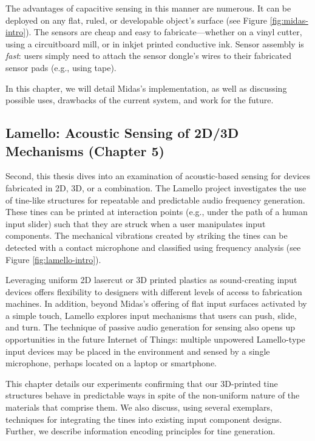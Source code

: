 The advantages of capacitive sensing in this manner are numerous. It can be deployed on any flat, ruled, or developable object's surface (see Figure \ref{fig:midas-intro}). The sensors are cheap and easy to fabricate---whether on a vinyl cutter, using a circuitboard mill, or in inkjet printed conductive ink. Sensor assembly is \emph{fast}: users simply need to attach the sensor dongle's wires to their fabricated sensor pads (e.g., using tape).

In this chapter, we will detail Midas's implementation, as well as discussing possible uses, drawbacks of the current system, and work for the future.

\subsection{Lamello: Acoustic Sensing of 2D/3D Mechanisms (Chapter 5)}

Second, this thesis dives into an examination of acoustic-based sensing for devices fabricated in 2D, 3D, or a combination. The Lamello project investigates the use of tine-like structures for repeatable and predictable audio frequency generation. These tines can be printed at interaction points (e.g., under the path of a human input slider) such that they are struck when a user manipulates input components. The mechanical vibrations created by striking the tines can be detected with a contact microphone and classified using frequency analysis (see Figure \ref{fig:lamello-intro}).

Leveraging uniform 2D lasercut or 3D printed plastics as sound-creating input devices offers flexibility to designers with different levels of access to fabrication machines. In addition, beyond Midas's offering of flat input surfaces activated by a simple touch, Lamello explores input mechanisms that users can push, slide, and turn. The technique of passive audio generation for sensing also opens up opportunities in the future Internet of Things: multiple unpowered Lamello-type input devices may be placed in the environment and sensed by a single microphone, perhaps located on a laptop or smartphone.

This chapter details our experiments confirming that our 3D-printed tine structures behave in predictable ways in spite of the non-uniform nature of the materials that comprise them. We also discuss, using several exemplars, techniques for integrating the tines into existing input component designs. Further, we describe information encoding principles for tine generation.

